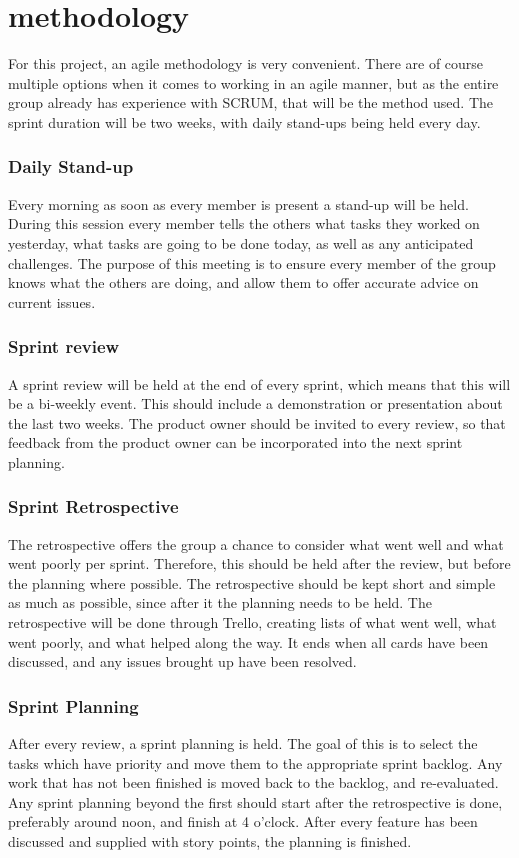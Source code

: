 \section{methodology}
For this project, an agile methodology is very convenient.
There are of course multiple options when it comes to working in an agile manner, but as the entire group already has experience with SCRUM, that will be the method used.
The sprint duration will be two weeks, with daily stand-ups  being held every day.

\subsubsection{Daily Stand-up}
\label{sec::standup}
Every morning as soon as every member is present a stand-up will be held.
During this session every member tells the others what tasks they worked on yesterday, what tasks are going to be done today, as well as any anticipated challenges.
The purpose of this meeting is to ensure every member of the group knows what the others are doing, and allow them to offer accurate advice on current issues.

\subsubsection{Sprint review}
\label{sec::sprintrev}
A sprint review will be held at the end of every sprint, which means that this will be a bi-weekly event.
This should include a demonstration or presentation about the last two weeks.
The product owner should be invited to every review, so that feedback from the product owner can be incorporated into the next sprint planning.

\subsubsection{Sprint Retrospective}
The retrospective offers the group a chance to consider what went well and what went poorly per sprint.
Therefore, this should be held after the review, but before the planning where possible.
The retrospective should be kept short and simple as much as possible, since after it the planning needs to be held.
The retrospective will be done through Trello, creating lists of what went well, what went poorly, and what helped along the way.
It ends when all cards have been discussed, and any issues brought up have been resolved.

\subsubsection{Sprint Planning}
After every review, a sprint planning is held.
The goal of this is to select the tasks which have priority and move them to the appropriate sprint backlog. 
Any work that has not been finished is moved back to the backlog, and re-evaluated.
Any sprint planning beyond the first should start after the retrospective is done, preferably around noon, and finish at 4 o'clock.
After every feature has been discussed and supplied with story points, the planning is finished.
\newpage

